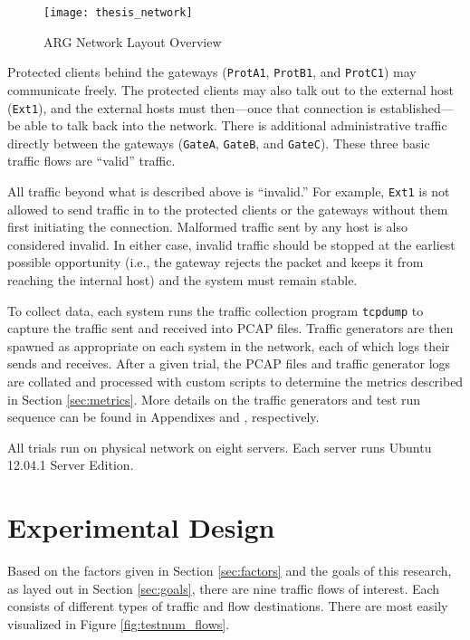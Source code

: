\begin{figure}
	\centering
	\caption{ARG Network Layout Overview }
	\label{fig:argnetwork}
	\texttt{[image: thesis\_network]}
\end{figure}

\par Protected clients behind the gateways (\texttt{ProtA1}, \texttt{ProtB1}, and \texttt{ProtC1}) may communicate freely. The protected clients may also talk out to the external host (\texttt{Ext1}), and the external hosts must then---once that connection is established---be able to talk back into the network. There is additional administrative traffic directly between the gateways (\texttt{GateA}, \texttt{GateB}, and \texttt{GateC}). These three basic traffic flows are ``valid'' traffic.

\par All traffic beyond what is described above is ``invalid.'' For example, \texttt{Ext1} is not allowed to send traffic in to the protected clients or the gateways without them first initiating the connection. Malformed traffic sent by any host is also considered invalid. In either case, invalid traffic should be stopped at the earliest possible opportunity (i.e., the gateway rejects the packet and keeps it from reaching the internal host) and the system must remain stable.

\par To collect data, each system runs the traffic collection program \texttt{tcpdump} to capture the traffic sent and received into \ac{PCAP} files. Traffic generators are then spawned as appropriate on each system in the network, each of which logs their sends and receives. After a given trial, the \ac{PCAP} files and traffic generator logs are collated and processed with custom scripts to determine the metrics described in Section \ref{sec:metrics}. More details on the traffic generators and test run sequence can be found in Appendixes  and , respectively.

\par {}

\par All trials run on physical network on eight servers. Each server runs Ubuntu 12.04.1 Server Edition.

\section{Experimental Design}
\label{sec:exp_design}
\par Based on the factors given in Section \ref{sec:factors} and the goals of this research, as layed out in Section \ref{sec:goals}, there are nine traffic flows of interest. Each consists of different types of traffic and flow destinations. There are most easily visualized in Figure \ref{fig:testnum_flows}.

